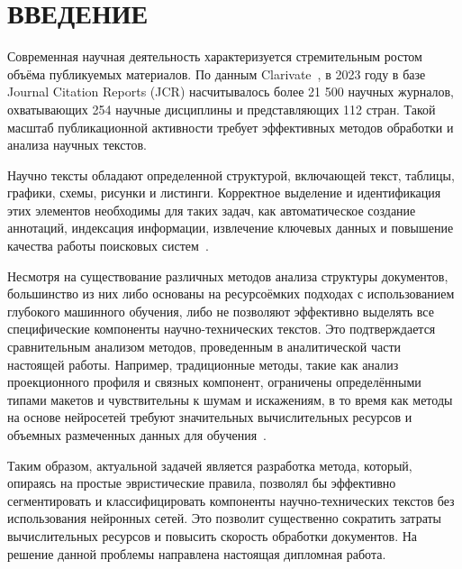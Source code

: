 \section*{ВВЕДЕНИЕ}


Современная научная деятельность характеризуется стремительным ростом объёма публикуемых материалов.
По данным Clarivate~\cite{clara}, в 2023 году в базе Journal Citation Reports (JCR) насчитывалось более 21 500 научных журналов, охватывающих 254 научные дисциплины и представляющих 112 стран.
Такой масштаб публикационной активности требует эффективных методов обработки и анализа научных текстов.

Научно тексты обладают определенной структурой, включающей текст, таблицы, графики, схемы, рисунки и листинги.
Корректное выделение и идентификация этих элементов необходимы для таких задач, как автоматическое создание аннотаций, индексация информации, извлечение ключевых данных и повышение качества работы поисковых систем~\cite{cui, shiz}.

Несмотря на существование различных методов анализа структуры документов, большинство из них либо основаны на ресурсоёмких подходах с использованием глубокого машинного обучения, либо не позволяют эффективно выделять все специфические компоненты научно-технических текстов.
Это подтверждается сравнительным анализом методов, проведенным в аналитической части настоящей работы.
Например, традиционные методы, такие как анализ проекционного профиля и связных компонент, ограничены определёнными типами макетов и чувствительны к шумам и искажениям, в то время как методы на основе нейросетей требуют значительных вычислительных ресурсов и объемных размеченных данных для обучения~\cite{dla-book, dla-survey}.

Таким образом, актуальной задачей является разработка метода, который, опираясь на простые эвристические правила, позволял бы эффективно сегментировать и классифицировать компоненты научно-технических текстов без использования нейронных сетей.
Это позволит существенно сократить затраты вычислительных ресурсов и повысить скорость обработки документов.
На решение данной проблемы направлена настоящая дипломная работа.

